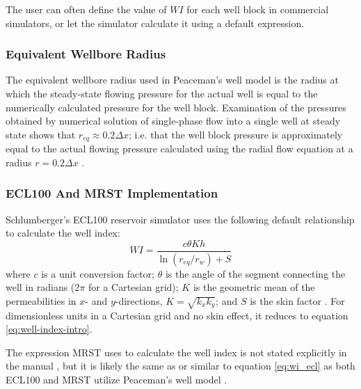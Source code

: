 The user can often define the value of $WI$ for each well block in commercial simulators, or let the simulator calculate it using a default expression.

\subsubsection{Equivalent Wellbore Radius} %
\label{ssub:equivalent_wellbore_radius}
The equivalent wellbore radius used in Peaceman's well model is the radius at which the steady-state flowing pressure for the actual well is equal to the numerically calculated pressure for the well block. Examination of the pressures obtained by numerical solution of single-phase flow into a single well at steady state shows that $r_{eq} \approx 0.2 \Delta x$; i.e. that the well block pressure is approximately equal to the actual flowing pressure calculated using the radial flow equation at a radius $r = 0.2 \Delta x$ \cite{Peaceman1978Interpretation}.

\subsubsection{ECL100 And MRST Implementation} %
\label{ssub:ecl100_implementation}
Schlumberger's ECL100 reservoir simulator uses the following default relationship to calculate the well index:
\begin{equation}
    \label{eq:wi_ecl}
    WI = \frac{c\theta K h}{\ln \left(r_{eq}/r_w\right)+S}
\end{equation}
where $c$ is a unit conversion factor; $\theta$ is the angle of the segment connecting the well in radians ($2\pi$ for a Cartesian grid); $K$ is the geometric mean of the permeabilities in $x$- and $y$-directions, $K=\sqrt{k_x k_y}$; and $S$ is the skin factor \cite{Schlumberger2013Eclipse}. For dimensionless units in a Cartesian grid and no skin effect, it reduces to equation \eqref{eq:well-index-intro}.

The expression MRST uses to calculate the well index is not stated explicitly in the manual \cite{Lie2014Introduction}, but it is likely the same as or similar to equation \eqref{eq:wi_ecl} as both ECL100 and MRST utilize Peaceman's well model \cite{Lie2014Introduction}.

